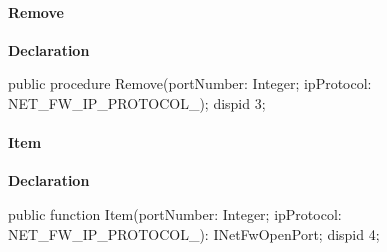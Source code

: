 \documentclass{report}
\newif\ifpdf
\begin{document}
\paragraph*{Remove}\hspace*{\fill}

\label{ok_dispid_method.INetFwOpenPortsDisp-Remove}
\begin{list}{}{
\setlength{\itemindent}{0cm}
\setlength{\listparindent}{0cm}
\setlength{\leftmargin}{\evensidemargin}
\addtolength{\leftmargin}{\tmplength}
\settowidth{\labelsep}{X}
\addtolength{\leftmargin}{\labelsep}
\setlength{\labelwidth}{\tmplength}
}
\item[\textbf{Declaration}\hfill]
\ifpdf
\begin{flushleft}
\fi
\begin{ttfamily}
public procedure Remove(portNumber: Integer; ipProtocol: NET{\_}FW{\_}IP{\_}PROTOCOL{\_}); dispid 3; \end{ttfamily}

\ifpdf
\end{flushleft}
\fi

\end{list}
\paragraph*{Item}\hspace*{\fill}

\label{ok_dispid_method.INetFwOpenPortsDisp-Item}
\begin{list}{}{
\setlength{\itemindent}{0cm}
\setlength{\listparindent}{0cm}
\setlength{\leftmargin}{\evensidemargin}
\addtolength{\leftmargin}{\tmplength}
\settowidth{\labelsep}{X}
\addtolength{\leftmargin}{\labelsep}
\setlength{\labelwidth}{\tmplength}
}
\item[\textbf{Declaration}\hfill]
\ifpdf
\begin{flushleft}
\fi
\begin{ttfamily}
public function Item(portNumber: Integer; ipProtocol: NET{\_}FW{\_}IP{\_}PROTOCOL{\_}): INetFwOpenPort; dispid 4; \end{ttfamily}

\ifpdf
\end{flushleft}
\fi

\end{list}
\end{document}
